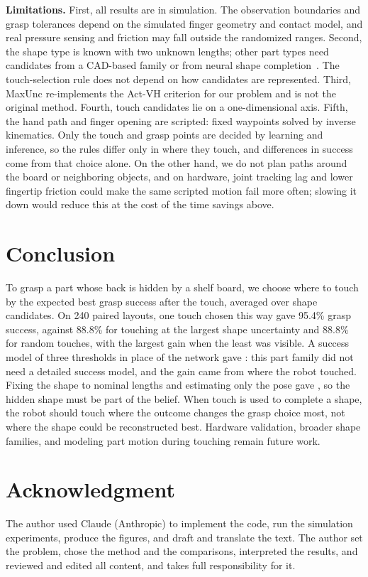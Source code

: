 \documentclass[conference]{IEEEtran}
\newcommand{\Unc}{MaxUnc}
\begin{document}
\textbf{Limitations.} First, all results are in simulation. The observation boundaries and grasp tolerances depend on the simulated finger geometry and contact model, and real pressure sensing and friction may fall outside the randomized ranges. Second, the shape type is known with two unknown lengths; other part types need candidates from a CAD-based family or from neural shape completion~\cite{rustler2022actvh,rustler2026shapegrasp}. The touch-selection rule does not depend on how candidates are represented. Third, \Unc{} re-implements the Act-VH criterion for our problem and is not the original method. Fourth, touch candidates lie on a one-dimensional axis. Fifth, the hand path and finger opening are scripted: fixed waypoints solved by inverse kinematics. Only the touch and grasp points are decided by learning and inference, so the rules differ only in where they touch, and differences in success come from that choice alone. On the other hand, we do not plan paths around the board or neighboring objects, and on hardware, joint tracking lag and lower fingertip friction could make the same scripted motion fail more often; slowing it down would reduce this at the cost of the time savings above.

\section{Conclusion}

To grasp a part whose back is hidden by a shelf board, we choose where to touch by the expected best grasp success after the touch, averaged over shape candidates. On 240 paired layouts, one touch chosen this way gave 95.4\% grasp success, against 88.8\% for touching at the largest shape uncertainty and 88.8\% for random touches, with the largest gain when the least was visible. A success model of three thresholds in place of the network gave \GeomSucc: this part family did not need a detailed success model, and the gain came from where the robot touched. Fixing the shape to nominal lengths and estimating only the pose gave \FixSucc, so the hidden shape must be part of the belief. When touch is used to complete a shape, the robot should touch where the outcome changes the grasp choice most, not where the shape could be reconstructed best. Hardware validation, broader shape families, and modeling part motion during touching remain future work.

\section*{Acknowledgment}
The author used Claude (Anthropic) to implement the code, run the simulation experiments, produce the figures, and draft and translate the text. The author set the problem, chose the method and the comparisons, interpreted the results, and reviewed and edited all content, and takes full responsibility for it.




\appendix

\end{document}

